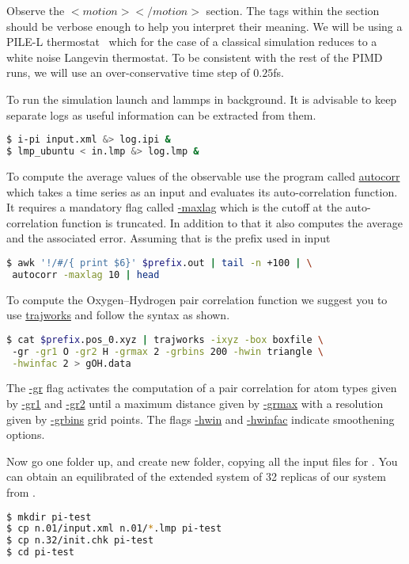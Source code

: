 \documentclass{article}
\begin{document}
\begin{Exercise}[label={water},title={Benchmark of quantum effects in a water molecule}]
\Question
Observe the \lstinxml$<motion></motion>$ section. The tags within the section should be 
verbose enough to help you interpret their meaning. We will be using a PILE-L thermostat~\cite{ceri+10jcp}
 which for the case of a classical simulation reduces to a white noise Langevin thermostat. 
To be consistent with the rest of the PIMD runs, we will use an over-conservative time step of $0.25$fs. 

\Question
To run the simulation launch \ipi{} and lammps in background. It is advisable to keep separate 
logs as useful information can be extracted from them.
\begin{lstlisting}[language=bash]
$ i-pi input.xml &> log.ipi &
$ lmp_ubuntu < in.lmp &> log.lmp &
\end{lstlisting}
To compute the average values of the observable use the program called \url{autocorr} which takes a time series as an input and evaluates its auto-correlation function. It requires a mandatory flag called \url{-maxlag} which is the cutoff at the auto-correlation function is truncated. In addition to that it also computes the average and the associated error. Assuming that  is the prefix used in \ipi{} input \begin{lstlisting}[language=bash]
$ awk '!/#/{ print $6}' $prefix.out | tail -n +100 | \
 autocorr -maxlag 10 | head
\end{lstlisting}

\Question
To compute the Oxygen--Hydrogen pair correlation function we suggest you to use \url{trajworks} and follow the syntax as shown.
\begin{lstlisting}[language=bash]
$ cat $prefix.pos_0.xyz | trajworks -ixyz -box boxfile \ 
 -gr -gr1 O -gr2 H -grmax 2 -grbins 200 -hwin triangle \
 -hwinfac 2 > gOH.data 
\end{lstlisting}
The \url{-gr} flag activates the computation of a pair correlation for atom types given by \url{-gr1} and \url{-gr2} until a maximum distance given by \url{-grmax} with a resolution given by \url{-grbins} grid points. The flags \url{-hwin} and \url{-hwinfac} indicate smoothening options.

\Question
Now go one folder up, and create new folder, copying all the input files 
for . You can obtain an equilibrated 
of the extended system of 32 replicas of our system from 
\lstinbash{n.32/init.chk}.

\begin{lstlisting}[language=bash]
$ mkdir pi-test
$ cp n.01/input.xml n.01/*.lmp pi-test
$ cp n.32/init.chk pi-test
$ cd pi-test
\end{lstlisting}


\end{Exercise}
\end{document}
